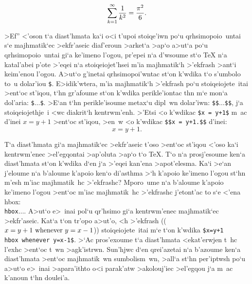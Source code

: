 $$\sum_{k=1}^{\infty} {1\over k^2} = {\pi^2\over6}.$$

>Ef'' <'oson t`a diast'hmata ka`i o<i t'upoi stoiqe'iwn po`u
qrhsimopoio~untai s`e majhmatik`ec >ekfr'aseic diaf'eroun >arket`a >ap`o
a>ut`a po`u qrhsimopoio~untai gi`a ke'imeno l'ogou, pr'epei n`a d'wsoume
st`o {\rm \TeX} n`a katal'abei p'ote >'eqei n`a stoiqeiojet'hsei m'ia
majhmatik`h >'ekfrash >ant`i keim'enou l'ogou.  A>ut`o g'inetai
qrhsimopoi'wntac st`on k'wdika t`o s'umbolo to~u dolar'iou {\tt\$}.
E>idik'wtera, m'ia majhmatik`h >'ekfrash po`u stoiqeiojete~itai >ent`oc
st'iqou, t`hn gr'afoume st`on k'wdika perikle'iontac thn m`e mon`a
dol'aria: {\tt\$$\ldots$\$}\null.  >E`an t`hn perikle'isoume metax`u
dipl~wn dolar'iwn: {\tt\$\$$\ldots$\$\$}, j`a stoiqeiojethje~i <wc
diakrit`h kentrwm'enh.  >'Etsi <o k'wdikac {\tt \$x = y+1\$} m~ac d'inei
$x=y+1$ >ent`oc st'iqou, >en~w <o k'wdikac {\tt \$\$x = y+1.\$\$}
d'inei: $$x=y+1.$$

T`a diast'hmata gi`a majhmatik`ec >ekfr'aseic t'oso >ent`oc st'iqou
<'oso ka`i kentrwm'enec >el'egqontai >ap'oluta >ap`o t`o {\rm
\TeX}\null.  T`o n`a prosj'esoume ken`a diast'hmata st`on k'wdika d`en
j`a >'eqei kan'ena >apo\-t'e\-lesma.  Ka`i >e`an j'eloume n`a b'aloume
k'apoio ken`o di'asthma >`h k'apoio ke'imeno l'ogou st`hn m'esh m'iac
majhmatik~hc >'ekfrashc?  Mporo~ume n`a b'aloume k'apoio ke'imeno l'ogou
>ent`oc m'iac majhmatik~hc >'ekfrashc j'etont'ac to s`e <'ena {\rm
hbox}: {\tt \\hbox\lb$\ldots$\rb}\null.  A>ut`o e>~inai pol`u qr'hsimo
gi`a kentrwm'enec majhmatik`ec >ekfr'aseic.  Kat`a t`on tr'opo a>ut'o,
<h >'ekfrash (($x=y+1 \hbox{ \rm whenever } y=x-1$)) stoiqeiojete~itai
m`e t`on k'wdika {\tt \$x=y+1 \\hbox\lb\ whenever \rb y=x-1\$}. >`Ac
pros'exoume t`a diast'hmata <ekat'erwjen t~hc l'exhc >ent`oc t~wn
>agk'istrwn.  Sun'hjwc d`en qrei'azetai n`a b'azoume ken`a diast'hmata
>ent`oc majhmatik~wn sumbolism~wn, >all`a st`hn pe\-r'i\-ptw\-sh po`u
a>ut`o e>~inai >apara'ithto o<i parak'atw >akolouj'iec >el'egqou j`a
m~ac k'anoun t`hn doulei'a.%


